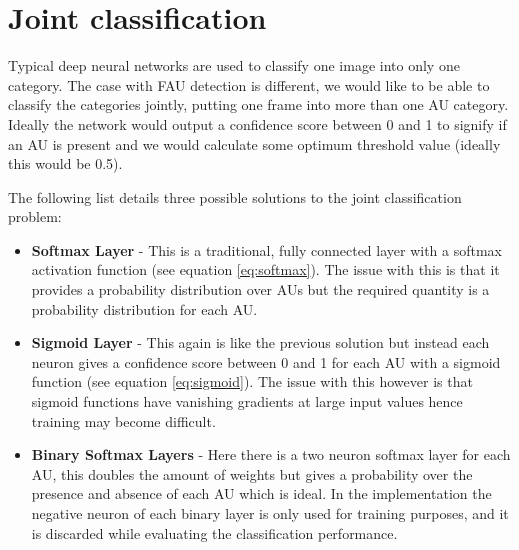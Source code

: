     \newpage
  \section{Joint classification}

    Typical deep neural networks are used to classify
    one image into only one category. The case with FAU detection is different, we
    would like to be able to classify the categories jointly,  putting one frame into more than
    one AU category. Ideally the network would output a confidence score between 0 and 1
    to signify if an AU is present and we would calculate some optimum threshold value
    (ideally this would be 0.5).

    The following list details three possible solutions to the joint classification problem:

    \begin{itemize} \label{sec:binsoft}
      \item {\bf Softmax Layer} - This is a traditional, fully connected layer with
                                  a softmax activation function (see equation \ref{eq:softmax}).
                                  The issue with this is that it provides a probability distribution over AUs
                                  but the required quantity is a probability distribution for each AU.
      \item {\bf Sigmoid Layer} - This again is like the previous solution but instead each neuron gives a confidence
                                  score between 0 and 1 for each AU with a sigmoid function (see equation \ref{eq:sigmoid}).
                                  The issue with this however is that sigmoid
                                  functions have vanishing gradients at large input values
                                  hence training may become difficult.
      \item {\bf Binary Softmax Layers} - Here there is a two neuron softmax layer
                                          for each AU, this doubles the amount of weights
                                          but gives a probability over the presence and
                                          absence of each AU which is ideal. In the implementation
                                          the negative neuron of each binary layer is only used for training purposes, and it is
                                          discarded while evaluating the classification performance.
    \end{itemize}

